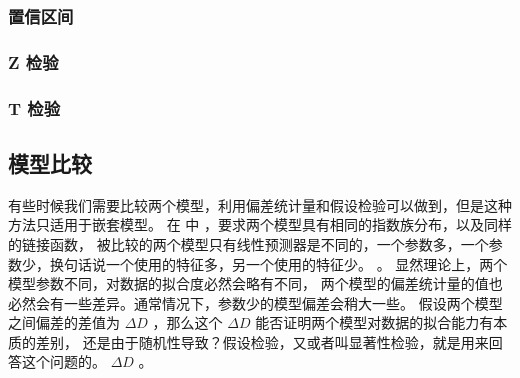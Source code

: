 \documentclass[letterpaper,10pt,english]{sphinxmanual}
\begin{document}
\subsubsection{置信区间}
\label{\detokenize{_u6a21_u578b_u8bc4_u4f30/influence:id10}}

\subsubsection{Z 检验}
\label{\detokenize{_u6a21_u578b_u8bc4_u4f30/influence:z}}

\subsubsection{T 检验}
\label{\detokenize{_u6a21_u578b_u8bc4_u4f30/influence:t}}

\subsection{模型比较}
\label{\detokenize{_u6a21_u578b_u8bc4_u4f30/influence:id11}}
有些时候我们需要比较两个模型，利用偏差统计量和假设检验可以做到，但是这种方法只适用于嵌套模型。
在  中 ，要求两个模型具有相同的指数族分布，以及同样的链接函数，
被比较的两个模型只有线性预测器是不同的，一个参数多，一个参数少，换句话说一个使用的特征多，另一个使用的特征少。
。
显然理论上，两个模型参数不同，对数据的拟合度必然会略有不同，
两个模型的偏差统计量的值也必然会有一些差异。通常情况下，参数少的模型偏差会稍大一些。
假设两个模型之间偏差的差值为 \(\Delta D\)
，那么这个 \(\Delta D\) 能否证明两个模型对数据的拟合能力有本质的差别，
还是由于随机性导致？假设检验，又或者叫显著性检验，就是用来回答这个问题的。
 \(\Delta D\) 
。
\end{document}
